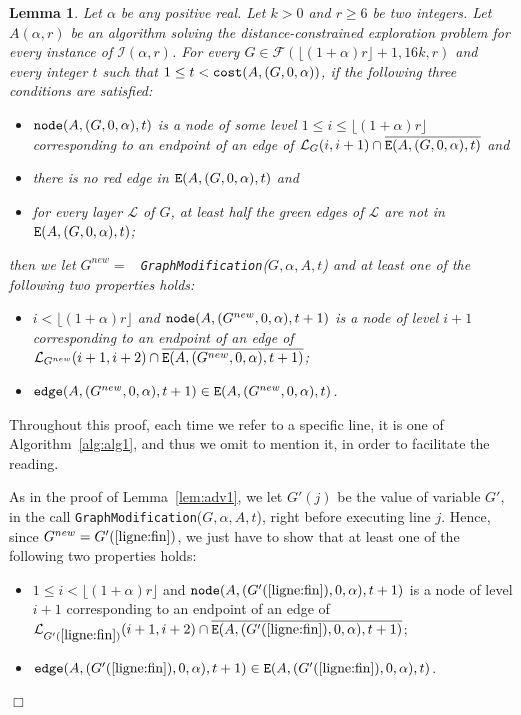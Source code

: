 \documentclass[11pt]{article}
\newtheorem{lemma}{Lemma}[section]
\newcommand{\qed}{\hfill $\Box$ \bigbreak}
\newenvironment{proof}{\noindent {\bf Proof.}}{\qed}
\begin{document}
{\begin{lemma}
\label{lem:adv2}
Let $\alpha$ be any positive real. Let $k>0$ and $r\geq 6$ be two integers.
Let $A(\alpha,r)$ be an algorithm solving the distance-constrained exploration problem for every instance of $\mathcal{I}(\alpha,r)$.
For every $G\in\mathcal{F}(\lfloor(1+\alpha)r\rfloor+1,16k,r)$ and every integer $t$ such that $1\leq t < {\tt cost}(A,(G,0,\alpha))$, if the following three conditions are satisfied: 
\begin{itemize}
\item ${\tt node}(A,(G,0,\alpha),t)$ is a node of some level $1\leq i\leq\lfloor(1+\alpha)r\rfloor$ corresponding to an endpoint of an edge of $\mathcal{L}_{G}(i,i+1)\cap\overline{{\tt E}(A,(G,0,\alpha),t)}$ and
\item there is no red edge in ${\tt E}(A,(G,0,\alpha),t)$ and
\item for every layer $\mathcal{L}$ of $G$, at least half the green edges of $\mathcal{L}$ are not in ${\tt E}(A,(G,0,\alpha),t)$;
\end{itemize} 
then we let $G^{new}=$ {\tt
  GraphModification}($G,\alpha,A,t$) and at least one of the
following two properties holds:
\begin{itemize}
\item $i<\lfloor(1+\alpha)r\rfloor$ and ${\tt node}(A,(G^{new},0,\alpha),t+1)$ is a node of level $i+1$ corresponding to an endpoint of an edge of $\mathcal{L}_{G^{new}}(i+1,i+2)\cap\overline{{\tt E}(A,(G^{new},0,\alpha),t+1)}$;
\item ${\tt edge}(A,(G^{new},0,\alpha),t+1)\in{\tt E}(A,(G^{new},0,\alpha),t)$.
\end{itemize}
\end{lemma}

\begin{proof}
Throughout this proof, each time we refer to a specific line, it is one of Algorithm~\ref{alg:alg1}, and thus we
omit to mention it, in order to facilitate the reading.

As in the proof of Lemma~\ref{lem:adv1}, we let $G'(j)$ be the value of variable $G'$, in the call {\tt GraphModification}($G,\alpha,A,t$), right before executing line $j$. Hence, since $G^{new}=G'(\ref{ligne:fin})$, we just have to show that at least one of the following two properties holds:

\begin{itemize}
\item $1\leq i<\lfloor(1+\alpha)r\rfloor$ and ${\tt node}(A,(G'(\ref{ligne:fin}),0,\alpha),t+1)$ is a node of level $i+1$ corresponding to an endpoint of an edge of $\mathcal{L}_{G'(\ref{ligne:fin})}(i+1,i+2)\cap\overline{{\tt E}(A,(G'({\ref{ligne:fin}}),0,\alpha),t+1)}$;
\item ${\tt edge}(A,(G'(\ref{ligne:fin}),0,\alpha),t+1)\in{\tt E}(A,(G'(\ref{ligne:fin}),0,\alpha),t)$.
\end{itemize}


\end{proof}}
\end{document}
